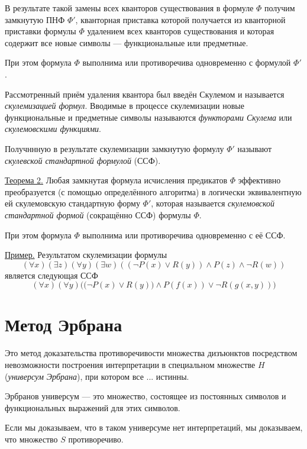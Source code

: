 В результате такой замены всех кванторов существования в формуле $\Phi$ получим замкнутую ПНФ $\Phi'$, кванторная приставка которой получается из кванторной приставки формулы $\Phi$ удалением всех кванторов существования и которая содержит все новые символы --- функциональные или предметные.

При этом формула $\Phi$ выполнима или противоречива одновременно с формулой $\Phi'$.

Рассмотренный приём удаления квантора был введён Скулемом и называется {\it скулемизацией формул}. Вводимые в процессе скулемизации новые функциональные и предметные символы называются {\it функторами Скулема} или {\it скулемовскими функциями}.

Получннную в результате скулемизации замкнутую формулу $\Phi'$ называют {\it скулевской стандартной формулой} (ССФ).

\underline{Теорема 2.} Любая замкнутая формула исчисления предикатов $\Phi$ эффективно преобразуется (с помощью определённого алгоритма) в логически эквивалентную ей скулемовскую стандартную форму $\Phi'$, которая называется {\it скулемовской стандартной формой} (сокращённо ССФ) формулы $\Phi$.

При этом формула $\Phi$ выполнима или противоречива одновременно с её ССФ.

\underline{Пример.} Результатом скулемизации формулы
\begin{equation*}
    (\forall x)(\exists z)(\forall y)(\exists w)((\neg P(x) \lor R(y)) \land P(z) \land \neg R(w))
\end{equation*}
является следующая ССФ
\begin{equation*}
    (\forall x)(\forall y)\Bigg(\Big(\neg P(x) \lor R(y)\Big) \land P(f(x)) \lor \neg R(g(x, y))\Bigg)
\end{equation*}

\section{Метод Эрбрана}
Это метод доказательства противоречивости множества дизъюнктов посредством невозможности построения интерпретации в специальном множестве $H$ ({\it универсум Эрбрана}), при котором все ... истинны.

Эрбранов универсум --- это множество, состоящее из постоянных символов и функциональных выражений для этих символов.

Если мы доказываем, что в таком универсуме нет интерпретаций, мы доказываем, что множество $S$ противоречиво. \newline

